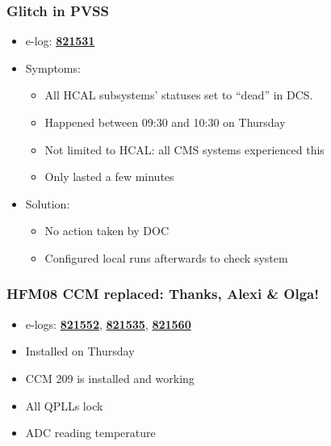 \documentclass[bigger]{beamer}
\providecommand{\alert}[1]{\textbf{#1}}
\begin{document}
\begin{frame}
\frametitle{Glitch in PVSS}
\label{sec-2-1-2}
\begin{itemize}

\item e-log: \href{http://cmsonline.cern.ch/cms-elog/821531}{\alert{821531}}
\label{sec-2-1-2-1}%

\item Symptoms:
\label{sec-2-1-2-2}%
\begin{itemize}

\item All HCAL subsystems' statuses set to ``dead'' in DCS.
\label{sec-2-1-2-2-1}%

\item Happened between 09:30 and 10:30 on Thursday
\label{sec-2-1-2-2-2}%

\item Not limited to HCAL: all CMS systems experienced this
\label{sec-2-1-2-2-3}%

\item Only lasted a few minutes
\label{sec-2-1-2-2-4}%
\end{itemize} %

\item Solution:
\label{sec-2-1-2-3}%
\begin{itemize}

\item No action taken by DOC
\label{sec-2-1-2-3-1}%

\item Configured local runs afterwards to check system
\label{sec-2-1-2-3-2}%
\end{itemize} %
\end{itemize} %
\end{frame}
\begin{frame}
\frametitle{HFM08 CCM replaced: Thanks, Alexi \& Olga!}
\label{sec-2-1-3}
\begin{itemize}

\item e-logs: \href{http://cmsonline.cern.ch/cms-elog/821552}{\alert{821552}}, \href{http://cmsonline.cern.ch/cms-elog/821535}{\alert{821535}}, \href{http://cmsonline.cern.ch/cms-elog/821560}{\alert{821560}}
\label{sec-2-1-3-1}%

\item Installed on Thursday
\label{sec-2-1-3-2}%

\item CCM 209 is installed and working
\label{sec-2-1-3-3}%

\item All QPLLs lock
\label{sec-2-1-3-4}%

\item ADC reading temperature
\label{sec-2-1-3-5}%
\end{itemize} %
\end{frame}
\end{document}
